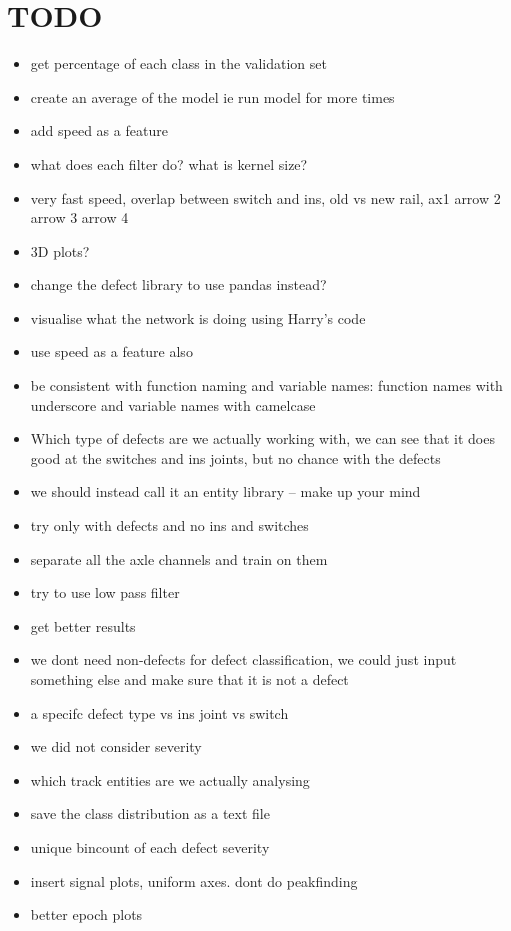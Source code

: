 \section{TODO}
\begin{itemize}
	\item get percentage of each class in the validation set
	\item create an average of the model ie run model for more times
	\item add speed as a feature
	\item what does each filter do? what is kernel size?
	\item very fast speed, overlap between switch and ins, old vs new rail, ax1 arrow 2 arrow 3 arrow 4
	\item 3D plots?
	\item change the defect library to use pandas instead?
	\item visualise what the network is doing using Harry's code
	\item use speed as a feature also
	\item be consistent with function naming and variable names: function names with underscore and variable names with camelcase
	\item Which type of defects are we actually working with, we can see that it does good at the switches and ins joints, but no chance with the defects
	\item we should instead call it an entity library -- make up your mind
	\item try only with defects and no ins and switches
	\item separate all the axle channels and train on them
	\item try to use low pass filter
	\item get better results
	\item we dont need non-defects for defect classification, we could just input something else and make sure that it is not a defect
	\item a specifc defect type vs ins joint vs switch
	\item we did not consider severity
	\item which track entities are we actually analysing
	\item save the class distribution as a text file
	\item unique bincount of each defect severity
	\item insert signal plots, uniform axes. dont do peakfinding
	\item better epoch plots
\end{itemize}

